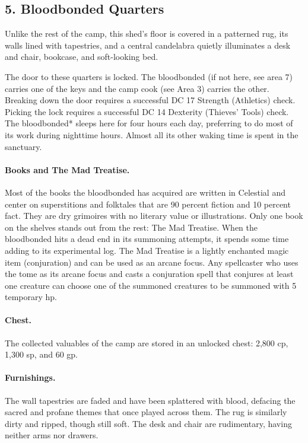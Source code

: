 \documentclass[10pt,a4paper,twoside,twocolumn,openany,bg=print,nodeprecatedcode]{dndbook}
\begin{document}
\subsection{5. Bloodbonded Quarters}
\begin{DndReadAloud}{}
Unlike the rest of the camp, this shed's floor is covered in a patterned rug, its walls lined with tapestries, and a central candelabra quietly illuminates a desk and chair, bookcase, and soft-looking bed.
\end{DndReadAloud}

The door to these quarters is locked. The bloodbonded (if not here, see area 7) carries one of the keys and the camp cook (see Area 3) carries the other. Breaking down the door requires a successful DC 17 Strength (Athletics) check. Picking the lock requires a successful DC 14 Dexterity (Thieves' Tools) check.
The bloodbonded* sleeps here for four hours each day, preferring to do most of its work during nighttime hours. Almost all its other waking time is spent in the sanctuary.
\paragraph{Books and The Mad Treatise.}
Most of the books the bloodbonded has acquired are written in Celestial and center on superstitions and folktales that are 90 percent fiction and 10 percent fact. They are dry grimoires with no literary value or illustrations. Only one book on the shelves stands out from the rest: The Mad Treatise. When the bloodbonded hits a dead end in its summoning attempts, it spends some time adding to its experimental log. The Mad Treatise is a lightly enchanted magic item (conjuration) and can be used as an arcane focus. Any spellcaster who uses the tome as its arcane focus and casts a conjuration spell that conjures at least one creature can choose one of the summoned creatures to be summoned with 5 temporary hp.
\paragraph{Chest.}
The collected valuables of the camp are stored in an unlocked chest: 2,800 cp, 1,300 sp, and 60 gp.
\paragraph{Furnishings.}
The wall tapestries are faded and have been splattered with blood, defacing the sacred and profane themes that once played across them. The rug is similarly dirty and ripped, though still soft. The desk and chair are rudimentary, having neither arms nor drawers.
\end{document}
